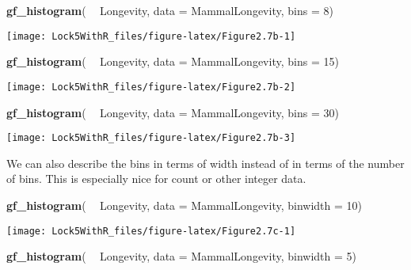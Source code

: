 \documentclass[]{book}
\newenvironment{Shaded}{\begin{snugshade}}{\end{snugshade}}
\newcommand{\DataTypeTok}[1]{\textcolor[rgb]{0.13,0.29,0.53}{#1}}
\newcommand{\DecValTok}[1]{\textcolor[rgb]{0.00,0.00,0.81}{#1}}
\newcommand{\KeywordTok}[1]{\textcolor[rgb]{0.13,0.29,0.53}{\textbf{#1}}}
\newcommand{\NormalTok}[1]{#1}
\newcommand{\OperatorTok}[1]{\textcolor[rgb]{0.81,0.36,0.00}{\textbf{#1}}}
\newcommand{\StringTok}[1]{\textcolor[rgb]{0.31,0.60,0.02}{#1}}
\begin{document}
\begin{Shaded}
\begin{Highlighting}[]
\KeywordTok{gf_histogram}\NormalTok{( }\OperatorTok{~}\StringTok{ }\NormalTok{Longevity, }\DataTypeTok{data =}\NormalTok{ MammalLongevity, }\DataTypeTok{bins =} \DecValTok{8}\NormalTok{)}
\end{Highlighting}
\end{Shaded}

\texttt{[image: Lock5WithR\_files/figure-latex/Figure2.7b-1]}

\begin{Shaded}
\begin{Highlighting}[]
\KeywordTok{gf_histogram}\NormalTok{( }\OperatorTok{~}\StringTok{ }\NormalTok{Longevity, }\DataTypeTok{data =}\NormalTok{ MammalLongevity, }\DataTypeTok{bins =} \DecValTok{15}\NormalTok{)}
\end{Highlighting}
\end{Shaded}

\texttt{[image: Lock5WithR\_files/figure-latex/Figure2.7b-2]}

\begin{Shaded}
\begin{Highlighting}[]
\KeywordTok{gf_histogram}\NormalTok{( }\OperatorTok{~}\StringTok{ }\NormalTok{Longevity, }\DataTypeTok{data =}\NormalTok{ MammalLongevity, }\DataTypeTok{bins =} \DecValTok{30}\NormalTok{)}
\end{Highlighting}
\end{Shaded}

\texttt{[image: Lock5WithR\_files/figure-latex/Figure2.7b-3]}

We can also describe the bins in terms of width instead of in terms of the number of bins. This is especially nice for count or other integer data.

\begin{Shaded}
\begin{Highlighting}[]
\KeywordTok{gf_histogram}\NormalTok{( }\OperatorTok{~}\StringTok{ }\NormalTok{Longevity, }\DataTypeTok{data =}\NormalTok{ MammalLongevity, }\DataTypeTok{binwidth =} \DecValTok{10}\NormalTok{)}
\end{Highlighting}
\end{Shaded}

\texttt{[image: Lock5WithR\_files/figure-latex/Figure2.7c-1]}

\begin{Shaded}
\begin{Highlighting}[]
\KeywordTok{gf_histogram}\NormalTok{( }\OperatorTok{~}\StringTok{ }\NormalTok{Longevity, }\DataTypeTok{data =}\NormalTok{ MammalLongevity, }\DataTypeTok{binwidth =} \DecValTok{5}\NormalTok{)}
\end{Highlighting}
\end{Shaded}
\end{document}

